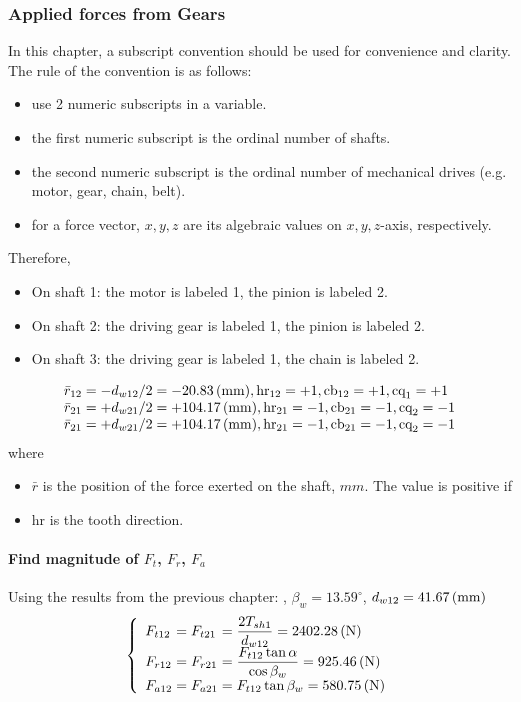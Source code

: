 \subsubsection{Applied forces from Gears}
In this chapter, a subscript convention should be used for convenience and clarity. The rule of the convention is as follows:
\begin{itemize}
	\item use 2 numeric subscripts in a variable.
	\item the first numeric subscript is the ordinal number of shafts.
	\item the second numeric subscript is the ordinal number of mechanical drives (e.g. motor, gear, chain, belt).
	\item for a force vector, $ x,y,z $ are its algebraic values on $ x,y,z $-axis, respectively.
\end{itemize}
Therefore,
\begin{itemize}
	\item On shaft 1: the motor is labeled 1, the pinion is labeled 2.
	\item On shaft 2: the driving gear is labeled 1, the pinion is labeled 2.
	\item On shaft 3: the driving gear is labeled 1, the chain is labeled 2.
\end{itemize}
\[ \begin{array}{l}
\bar{r}_{12} = -d_{w12}/2 = -20.83\, (\mathrm{mm}), \text{hr}_{12} = +1, \text{cb}_{12} = +1, \text{cq}_1 = +1\\
\bar{r}_{21} = +d_{w21}/2 = +104.17\, (\mathrm{mm}), \text{hr}_{21} = -1, \text{cb}_{21} = -1, \text{cq}_2 = -1\\
\bar{r}_{21} = +d_{w21}/2 = +104.17\, (\mathrm{mm}), \text{hr}_{21} = -1, \text{cb}_{21} = -1, \text{cq}_2 = -1
\end{array} \]
where
\begin{itemize}
	\item $ \bar{r} $ is the position of the force exerted on the shaft, $\unit{mm}$. The value is positive if 
	\item $ \text{hr} $ is the tooth direction.
\end{itemize}
\paragraph{Find magnitude of $ F_{t} $, $ F_r $, $ F_a $}
Using the results from the previous chapter: , $ \beta_w = 13.59^\circ $, $ d_{w12}= 41.67\, (\mathrm{mm}) $
\[
\left\{ 
\begin{array}{l@{{}={}}l@{{}={}}l}
F_{t12}& F_{t21}& \dfrac{2T_{sh1}}{d_{w12}}= 2402.28\unitp{N}\\
F_{r12}& F_{r21}&  \dfrac{F_{t12}\tan\alpha}{\cos\beta_w}= 925.46 \unitp{N}\\
F_{a12}& F_{a21}& F_{t12}\tan\beta_w= 580.75 \unitp{N}\\ 
\end{array}
\right.
\]
